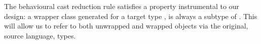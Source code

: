\documentclass[acmlarge, anonymous, authordraft]{acmart}
\newcommand{\FZ}[1]{\textbf{FZ: #1}}
\begin{document}
%

%
%
% 

% 



The behavioural cast reduction rule satisfies a property instrumental to our design: a wrapper class generated for a target type \D,  is always a subtype of \D.  This will allow us to refer to both
unwrapped and wrapped objects via the original, source language,
types.   
%
%
%



%
%
\end{document}
